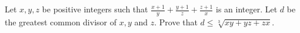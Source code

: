 Let $x,y,z$ be positive integers such that $\frac{x+1}{y}+\frac{y+1}{z}+\frac{z+1}{x}$ is an integer. Let $d$ be the greatest common divisor of $x,y$ and $z$. Prove that $d\le \sqrt[3]{xy+yz+zx}$.